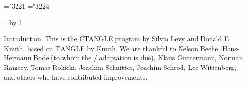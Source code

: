 






\def\hang{\hangindent 3em\indent\ignorespaces}
\def\pb{$\.|\ldots\.|$} %
\def\v{\char'174} %
\mathchardef\RA="3221 %
\mathchardef\BA="3224 %

\def\title{CTANGLE (Version 4.7)}
\def\topofcontents{\null\vfill
  \centerline{\titlefont The {\ttitlefont CTANGLE} processor}
  \vskip 15pt
  \centerline{(Version 4.7)}
  \vfill}
\def\botofcontents{\vfill
\noindent
Copyright \copyright\ 1987, 1990, 1993, 2000 Silvio Levy and Donald E. Knuth
\bigskip\noindent
Permission is granted to make and distribute verbatim copies of this
document provided that the copyright notice and this permission notice
are preserved on all copies.

\smallskip\noindent
Permission is granted to copy and distribute modified versions of this
document under the conditions for verbatim copying, provided that the
entire resulting derived work is given a different name and distributed
under the terms of a permission notice identical to this one.
}
\pageno=\contentspagenumber \advance\pageno by 1
\let\maybe=\iftrue


Introduction.
This is the \.{CTANGLE} program by Silvio Levy and Donald E. Knuth,
based on \.{TANGLE} by Knuth.
We are thankful to
Nelson Beebe, Hans-Hermann Bode (to whom the \CPLUSPLUS/ adaptation is due),
Klaus Guntermann, Norman Ramsey, Tomas Rokicki, Joachim Schnitter,
Joachim Schrod, Lee Wittenberg, and others who have contributed improvements.

